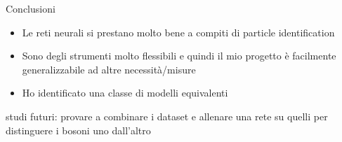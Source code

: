 \documentclass{beamer}
\begin{document}
\begin{frame}{Conclusioni}
  \begin{itemize}
    \item Le reti neurali si prestano molto bene a compiti di particle identification
    \item Sono degli strumenti molto flessibili e quindi il mio progetto è facilmente generalizzabile ad altre necessità/misure
    \item Ho identificato una classe di modelli equivalenti
  \end{itemize}
  \vspace{2ex}

  studi futuri: provare a combinare i dataset e allenare una rete su quelli per distinguere i bosoni uno dall'altro

    \vspace*{4ex}
    \begin{columns}
      {
        \begin{block}{}
          \centering\vspace*{1ex}
        \vspace*{1ex}
      \end{block}
      }
    \end{columns}
\end{frame}
\end{document}
